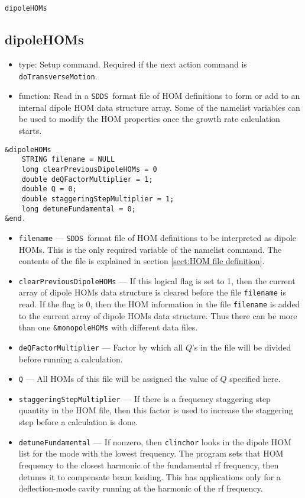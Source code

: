 \documentclass[11pt]{article}
\newcommand{\SDDS}{{\tt SDDS}}
\begin{document}
\newpage
\begin{center}{\tt dipoleHOMs}\end{center}
\subsection{dipoleHOMs}

\begin{itemize}
\item type: Setup command. Required if the next action command is {\tt
      doTransverseMotion}.
\item function: Read in a \SDDS\ format file of HOM definitions to
      form or add to an internal dipole HOM data structure array.
      Some of the namelist variables can be used to modify the HOM
      properties once the growth rate calculation starts.
\end{itemize}
\begin{verbatim}
&dipoleHOMs
    STRING filename = NULL
    long clearPreviousDipoleHOMs = 0
    double deQFactorMultiplier = 1;
    double Q = 0;
    double staggeringStepMultiplier = 1;
    long detuneFundamental = 0;
&end.
\end{verbatim}
\begin{itemize}
\item {\tt filename} --- \SDDS\ format file of HOM definitions to be
      interpreted as dipole HOMs. This is the only required variable
      of the namelist command. The contents of the file is explained
      in section \ref{sect:HOM file definition}.
\item {\tt clearPreviousDipoleHOMs} --- If this logical flag is set to
      1, then the current array of dipole HOMs data structure is
      cleared before the file {\tt filename} is read. If the flag is
      0, then the HOM information in the file {\tt filename} is added
      to the current array of dipole HOMs data structure. Thus there
      can be more than one {\tt \&monopoleHOMs} with different data files.
\item {\tt deQFactorMultiplier} --- Factor by which all $Q$'s in the 
      file will be divided before running a calculation.
\item {\tt Q} --- All HOMs of this file will be assigned the value of $Q$
      specified here.
\item {\tt staggeringStepMultiplier} --- If there is a frequency staggering step
      quantity in the HOM file, then this factor is used to increase the 
      staggering step before a calculation is done.
\item {\tt detuneFundamental} --- If nonzero, then {\tt clinchor} looks in
      the dipole HOM list for the mode with the lowest frequency. 
      The program sets that HOM frequency to the closest harmonic of the
      fundamental rf frequency, then detunes it to compensate beam loading.  
      This has applications only for a deflection-mode cavity running
      at the harmonic of the rf frequency.
\end{itemize}
\end{document}
